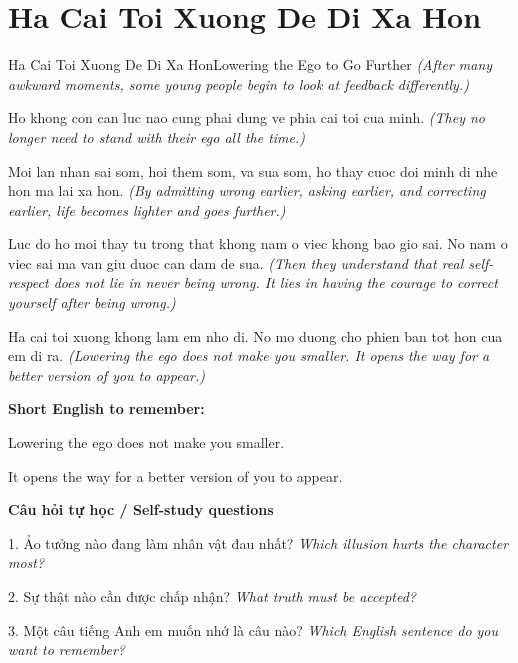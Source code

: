\section{Ha Cai Toi Xuong De Di Xa Hon}
\begin{truyen}{Ha Cai Toi Xuong De Di Xa Hon}{Lowering the Ego to Go Further}
\textit{(After many awkward moments, some young people begin to look at feedback differently.)}

Ho khong con can luc nao cung phai dung ve phia cai toi cua minh.
\textit{(They no longer need to stand with their ego all the time.)}

Moi lan nhan sai som, hoi them som, va sua som, ho thay cuoc doi minh di nhe hon ma lai xa hon.
\textit{(By admitting wrong earlier, asking earlier, and correcting earlier, life becomes lighter and goes further.)}

Luc do ho moi thay tu trong that khong nam o viec khong bao gio sai. No nam o viec sai ma van giu duoc can dam de sua.
\textit{(Then they understand that real self-respect does not lie in never being wrong. It lies in having the courage to correct yourself after being wrong.)}

\end{truyen}

\begin{baihoc}
Ha cai toi xuong khong lam em nho di. No mo duong cho phien ban tot hon cua em di ra.
\textit{(Lowering the ego does not make you smaller. It opens the way for a better version of you to appear.)}
\end{baihoc}

\begin{ghinhoanh}
\textbf{Short English to remember:}

Lowering the ego does not make you smaller.

It opens the way for a better version of you to appear.

\end{ghinhoanh}

\begin{tuhocnhanh}
\textbf{Câu hỏi tự học / Self-study questions}

1. Ảo tưởng nào đang làm nhân vật đau nhất? \textit{Which illusion hurts the character most?}

2. Sự thật nào cần được chấp nhận? \textit{What truth must be accepted?}

3. Một câu tiếng Anh em muốn nhớ là câu nào? \textit{Which English sentence do you want to remember?}
\end{tuhocnhanh}
